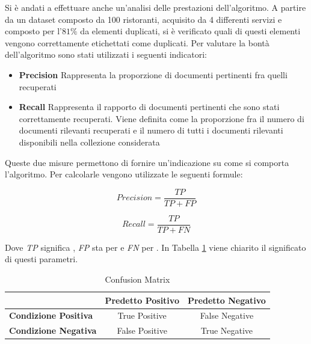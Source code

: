 Si è andati a effettuare anche un'analisi delle prestazioni dell'algoritmo. A partire da un dataset composto da 100 ristoranti, acquisito da 4 differenti servizi e composto per l'$ 81\% $ da elementi duplicati, si è verificato quali di questi elementi vengono correttamente etichettati come duplicati. Per valutare la bontà dell'algoritmo sono stati utilizzati i seguenti indicatori:

\begin{itemize}
	\item \textbf{Precision} Rappresenta la proporzione di documenti pertinenti fra quelli recuperati
	\item \textbf{Recall} Rappresenta il rapporto di documenti pertinenti che sono stati correttamente recuperati. Viene definita come la proporzione fra il numero di documenti rilevanti recuperati e il numero di tutti i documenti rilevanti disponibili nella collezione considerata
\end{itemize}

Queste due misure permettono di fornire un'indicazione su come si comporta l'algoritmo. Per calcolarle vengono utilizzate le seguenti formule:

\begin{center}
	\begin{minipage}[t]{0.5\textwidth}
		\begin{equation*}
			Precision = \frac{TP}{TP + FP}
		\end{equation*}
	\end{minipage}%
	\begin{minipage}[t]{0.5\textwidth}
		\begin{equation*}
			Recall = \frac{TP}{TP + FN}
		\end{equation*}
	\end{minipage}
\end{center}

Dove \emph{TP} significa , \emph{FP} sta per  e \emph{FN} per . In Tabella \ref{table:confusion-matrix} viene chiarito il significato di questi parametri.

\begin{table}[ht]
	\caption{Confusion Matrix}
	\label{table:confusion-matrix}
	\begin{tabularx}{\textwidth}{l | cc}
		\toprule
		& \textbf{Predetto Positivo} & \textbf{Predetto Negativo} \\
		\midrule
		\textbf{Condizione Positiva} & True Positive & False Negative  \\
		\hline
		\textbf{Condizione Negativa} & False Positive & True Negative \\
		\bottomrule
	\end{tabularx}
\end{table}

